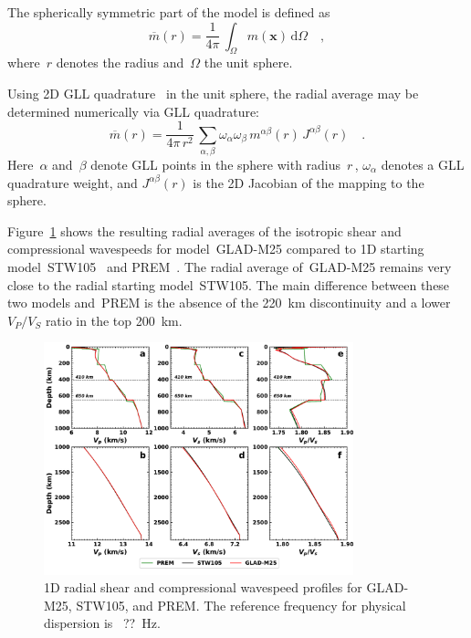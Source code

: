 \documentclass[extra,mreferee]{gji}
\begin{document}
The spherically symmetric part of the model is defined as
\begin{equation}
    \overline{m}(r)=\frac{1}{4\pi}\,\int_\Omega m(\mathbf{x})\,\mathrm{d} \Omega
    \quad,
\end{equation}
where~$r$ denotes the radius and~$\Omega$ the unit sphere.

Using 2D GLL quadrature~\citep{KoTr99} in the unit sphere,
the radial average may be determined numerically via GLL quadrature:
\begin{equation}
    \overline{m}(r)=\frac{1}{4\pi\,r^2}\,\sum_{\alpha,\beta}\omega_\alpha\omega_\beta\,m^{\alpha\beta}(r)\,J^{\alpha\beta}(r)
    \quad.
    \label{eq:radial_average}
\end{equation}
Here~$\alpha$ and~$\beta$ denote GLL points in the sphere with radius~$r$\,,
$\omega_\alpha$ denotes a GLL quadrature weight, and $J^{\alpha\beta}(r)$ is the 2D Jacobian of the mapping to the sphere.

Figure~\ref{fig:global-average} shows the resulting radial averages of the isotropic shear and compressional wavespeeds for model~GLAD-M25
compared to 1D starting model~STW105~\citep{kustowski2008anisotropic} and PREM~\citep{PREM}.
The radial average of~GLAD-M25 remains very close to the radial starting model~STW105.
The main difference between these two models and~PREM
is the absence of the 220~km discontinuity and a lower~$V_P/V_S$ ratio in the top 200~km.

\begin{figure}
  \centering
  \includegraphics[width=0.8\textwidth]{figures/1d_profile.pdf}
  \caption{1D radial shear and compressional wavespeed profiles for GLAD-M25, STW105, and PREM.
  The reference frequency for physical dispersion is~{\color{red} ??}~Hz.}
  \label{fig:global-average}
\end{figure}
\end{document}
